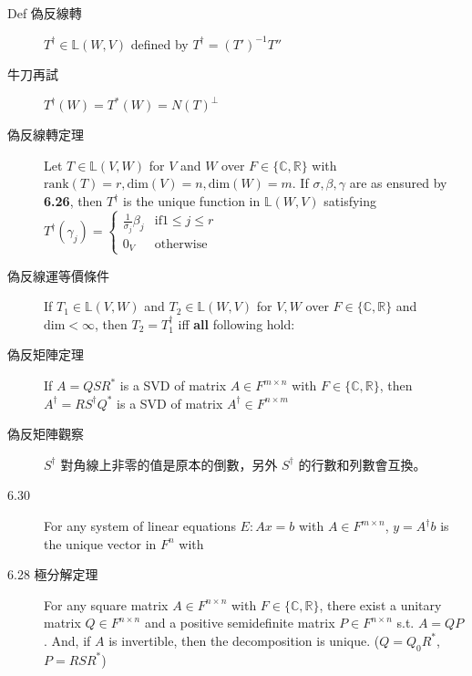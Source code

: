 \documentclass[9pt, twocolumn]{extarticle}
\newcommand{\vsdim}{\ensuremath{\text{dim}}}
\newcommand{\rank}{\ensuremath{\text{rank}}}
\newcommand{\realnum}{\mathbb{R}}
\newcommand{\complexnum}{\mathbb{C}}
\newcommand{\ltrans}{\mathbb{L}}
\begin{document}
\begin{description}
        
    \item[Def 偽反線轉] $T^\dagger \in \ltrans(W, V)$ defined by $T^\dagger = (T')^{-1}T''$
    \item[牛刀再試] $T^\dagger(W) = T^*(W) = N(T)^\perp$
    \item[偽反線轉定理] Let $T \in \ltrans(V,W)$ for $V$ and $W$ over $F \in \{\complexnum, \realnum\}$ with $\rank(T)=r, \vsdim(V)=n,\vsdim(W)=m$. If $\sigma, \beta, \gamma$ are as ensured by \textbf{6.26}, then $T^\dagger$ is the unique function in $\ltrans(W, V)$ satisfying $T^\dagger(\gamma_j)=\left\{\begin{array}{cl} \frac{1}{\sigma_j}\beta_j & \text{if} 1 \leq j \leq r\\ 0_V & \text{otherwise}\end{array}\right.$
    \item[偽反線運等價條件] If $T_1 \in \ltrans(V, W)$ and $T_2 \in \ltrans(W, V)$ for $V, W$ over $F \in \{\complexnum, \realnum\}$ and $\vsdim < \infty$, then $T_2 = T_1^\dagger$ iff \textbf{all} following hold:
    \item[偽反矩陣定理] If $A = QSR^*$ is a SVD of matrix $A \in F^{m\times n}$ with $F \in \{\complexnum, \realnum\}$, then $A^\dagger = RS^\dagger Q^*$ is a SVD of matrix $A^\dagger \in F^{n\times m}$
    \item[偽反矩陣觀察] $S^\dagger$ 對角線上非零的值是原本的倒數，另外 $S^\dagger$ 的行數和列數會互換。
    \item[6.30] For any system of linear equations $E: Ax = b$ with $A \in F^{m\times n}$, $y = A^\dagger b$ is the unique vector in $F^n$ with 
    \item[6.28 極分解定理] For any square matrix $A \in F^{n\times n}$ with $F \in \{\complexnum, \realnum\}$, there exist a unitary matrix $Q \in F^{n\times n}$ and a positive semidefinite matrix $P \in F^{n\times n}$ s.t. $A = QP$. And, if $A$ is invertible, then the decomposition is unique. ($Q = Q_0 R^*$, $P = R S R^*$)

\end{description}
\end{document}
